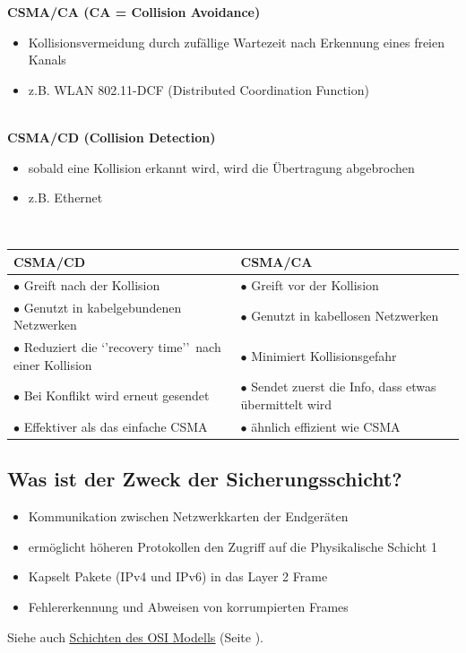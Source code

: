 \textbf{CSMA/CA (CA = Collision Avoidance)}
\begin{itemize}
    \item Kollisionsvermeidung durch zufällige Wartezeit nach Erkennung eines freien Kanals
    \item z.B. WLAN 802.11-DCF (Distributed Coordination Function)
\end{itemize}\,\\

\textbf{CSMA/CD (Collision Detection)}
\begin{itemize}
    \item sobald eine Kollision erkannt wird, wird die Übertragung abgebrochen
    \item z.B. Ethernet
\end{itemize}\,\\

\begin{tabularx}{\textwidth}{X|X}
    \multicolumn{1}{X}{CSMA/CD}&\multicolumn{1}{X}{CSMA/CA}\\
    \hline
    $\bullet$ Greift nach der Kollision&$\bullet$ Greift vor der Kollision\\
    $\bullet$ Genutzt in kabelgebundenen Netzwerken&$\bullet$ Genutzt in kabellosen Netzwerken\\
    $\bullet$ Reduziert die `'recovery time'' nach einer Kollision&$\bullet$ Minimiert Kollisionsgefahr\\
    $\bullet$ Bei Konflikt wird erneut gesendet&$\bullet$ Sendet zuerst die Info, dass etwas übermittelt wird\\
    $\bullet$ Effektiver als das einfache CSMA&$\bullet$ ähnlich effizient wie CSMA\\
\end{tabularx}


\subsection*{Was ist der Zweck der Sicherungsschicht?}\label{sub:Sicherungsschicht}
\begin{itemize}
    \item Kommunikation zwischen Netzwerkkarten der Endgeräten
    \item ermöglicht höheren Protokollen den Zugriff auf die Physikalische Schicht 1
    \item Kapselt Pakete (IPv4 und IPv6) in das Layer 2 Frame
    \item Fehlererkennung und Abweisen von korrumpierten Frames
\end{itemize}
Siehe auch \underline{\hyperref[sub:SchichtenOSIModell]{Schichten des OSI Modells}} (Seite \pageref{sub:SchichtenOSIModell}).

